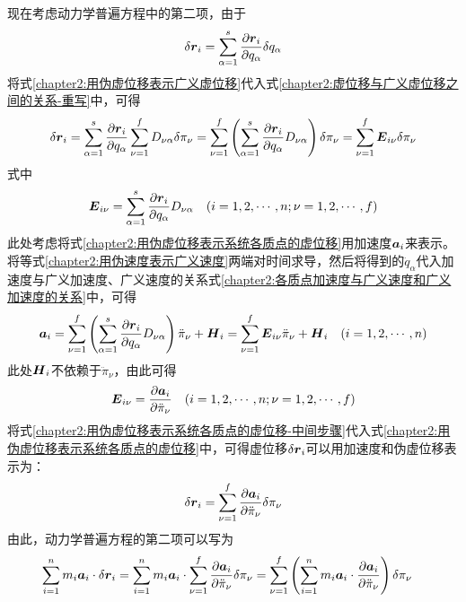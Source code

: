 现在考虑动力学普遍方程中的第二项，由于
\begin{equation}
	\delta\boldsymbol{r}_i = \sum_{\alpha=1}^s \frac{\partial \boldsymbol{r}_i}{\partial q_\alpha}\delta q_\alpha
	\label{chapter2:虚位移与广义虚位移之间的关系-重写}
\end{equation}
将式\eqref{chapter2:用伪虚位移表示广义虚位移}代入式\eqref{chapter2:虚位移与广义虚位移之间的关系-重写}中，可得
\begin{equation}
	\delta \boldsymbol{r}_i = \sum_{\alpha=1}^s \frac{\partial \boldsymbol{r}_i}{\partial q_\alpha} \sum_{\nu=1}^f D_{\nu\alpha}\delta\pi_\nu = \sum_{\nu=1}^f \left(\sum_{\alpha=1}^s \frac{\partial \boldsymbol{r}_i}{\partial q_\alpha} D_{\nu\alpha}\right)\delta\pi_\nu = \sum_{\nu=1}^f \boldsymbol{E}_{i\nu}\delta \pi_\nu
	\label{chapter2:用伪虚位移表示系统各质点的虚位移}
\end{equation}
式中
\begin{equation*}
	\boldsymbol{E}_{i\nu} = \sum_{\alpha=1}^s\frac{\partial \boldsymbol{r}_i}{\partial q_\alpha}D_{\nu\alpha}\quad (i=1,2,\cdots,n; \nu=1,2,\cdots,f)
\end{equation*}
此处考虑将式\eqref{chapter2:用伪虚位移表示系统各质点的虚位移}用加速度$\boldsymbol{a}_i$来表示。将等式\eqref{chapter2:用伪速度表示广义速度}两端对时间求导，然后将得到的$\ddot{q}_\alpha$代入加速度与广义加速度、广义速度的关系式\eqref{chapter2:各质点加速度与广义速度和广义加速度的关系}中，可得
\begin{equation}
	\boldsymbol{a}_i = \sum_{\nu=1}^f \left(\sum_{\alpha=1}^s \frac{\partial \boldsymbol{r}_i}{\partial q_\alpha}D_{\nu\alpha}\right) \ddot{\pi}_\nu + \boldsymbol{H}_i = \sum_{\nu=1}^f \boldsymbol{E}_{i\nu}\ddot{\pi}_\nu+\boldsymbol{H}_i\quad (i=1,2,\cdots,n)
\end{equation}
此处$\boldsymbol{H}_i$不依赖于$\ddot{\pi}_\nu$，由此可得
\begin{equation}
	\boldsymbol{E}_{i\nu} = \frac{\partial \boldsymbol{a}_i}{\partial \ddot{\pi}_\nu}\quad (i=1,2,\cdots,n; \nu=1,2,\cdots,f)
	\label{chapter2:用伪虚位移表示系统各质点的虚位移-中间步骤}
\end{equation}
将式\eqref{chapter2:用伪虚位移表示系统各质点的虚位移-中间步骤}代入式\eqref{chapter2:用伪虚位移表示系统各质点的虚位移}中，可得虚位移$\delta \boldsymbol{r}_i$可以用加速度和伪虚位移表示为：
\begin{equation}
	\delta \boldsymbol{r}_i = \sum_{\nu=1}^f \frac{\partial \boldsymbol{a}_i}{\partial \ddot{\pi}_\nu}\delta \pi_\nu
	\label{chapter2:用伪虚位移表示系统各质点的虚位移-另一种形式}
\end{equation}
由此，动力学普遍方程的第二项可以写为
\begin{align}
	\sum_{i=1}^n m_i\boldsymbol{a}_i\cdot\delta\boldsymbol{r}_i & = \sum_{i=1}^n m_i\boldsymbol{a}_i \cdot \sum_{\nu=1}^f \frac{\partial \boldsymbol{a}_i}{\partial \ddot{\pi}_\nu}\delta \pi_\nu = \sum_{\nu=1}^f \left(\sum_{i=1}^n m_i\boldsymbol{a}_i\cdot \frac{\partial \boldsymbol{a}_i}{\partial \ddot{\pi}_\nu}\right) \delta \pi_\nu
	\label{chapter2:Appell方程-中间过程1}
\end{align}
